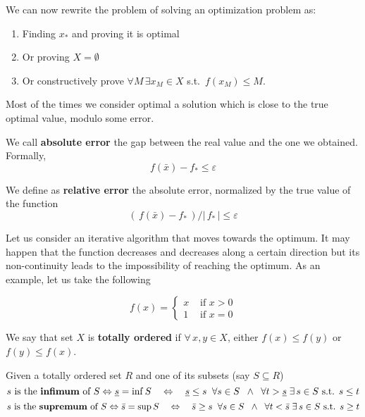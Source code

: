 \documentclass[computationalMathematics.tex]{subfiles}
\begin{document}
We can now rewrite the problem of solving an optimization problem as:
\begin{enumerate}
  \item Finding $x_*$ and proving it is optimal
  \item Or proving $X = \emptyset$
  \item Or constructively prove $\forall M \, \exists x_M \in X$ s.t.~$f(x_M) \leq M$.
\end{enumerate}

Most of the times we consider optimal a solution which is close to the true optimal value, modulo some error.

\begin{definition}
  We call \textbf{absolute error} the gap between the real value and the one we obtained. Formally,
\[
  f(\bar{x}) - f_* \leq \varepsilon
\]
\end{definition}

\begin{definition}
  We define as \textbf{relative error} the absolute error, normalized by the true value of the function
\[
  ( \, f(\bar{x}) - f_* \, ) / | \, f_* \, | \leq \varepsilon
\]
\end{definition}

Let us consider an iterative algorithm that moves towards the optimum.
It may happen that the function decreases and decreases along a certain direction but its non-continuity leads to the impossibility of reaching the optimum.
As an example, let us take the following

\[
  f(x) =\left\{\begin{array}{ll} x & \mbox{ if } x > 0 \\
        1 & \mbox{ if } x = 0
        \end{array}\right.
\]

\begin{definition}
  We say that  set $X$ is \textbf{totally ordered} if $\forall \, x, y \in X$, either $f(x) \leq f(y)$ or $f(y) \leq f(x)$.
\end{definition}

\begin{definition}
  Given a totally ordered set $R$ and one of its subsets (say $S \subseteq R$)
\[
  s\text{ is the {\bf infimum} of } S \Leftrightarrow \underline{s} = \inf S
  \quad\Leftrightarrow\quad
  \underline{s} \leq s \;\; \forall s \in S
  \;\;\wedge\;\;
  \forall t > \underline{s} \; \exists \, s \in S \mbox{ s.t. } s \leq t
\]
\[
  s \text{ is the {\bf supremum} of } S \Leftrightarrow \bar{s} = \sup S
  \quad\Leftrightarrow\quad
  \bar{s} \geq s \;\; \forall s \in S
  \;\;\wedge\;\;
  \forall t < \bar{s} \; \exists \, s \in S \mbox{ s.t. } s \geq t
\]

\end{definition}
\end{document}
